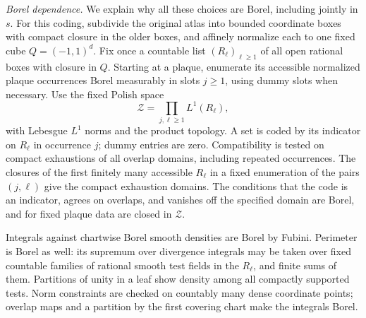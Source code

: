 \emph{Borel dependence.}
We explain why all these choices are Borel, including jointly in $s$.
For this coding, subdivide the original atlas into bounded coordinate
boxes with compact closure in the older boxes, and affinely normalize
each to one fixed cube $Q=(-1,1)^d$.  Fix once a countable list
$(R_\ell)_{\ell\ge1}$ of all open rational boxes with closure in $Q$.
Starting at a plaque, enumerate its accessible normalized plaque
occurrences Borel measurably in slots $j\ge1$, using dummy slots when
necessary.  Use the fixed Polish space
\[
             \mathcal Z=\prod_{j,\ell\ge1}L^1(R_\ell),
\]
with Lebesgue $L^1$ norms and the product topology.  A set is coded by its
indicator on $R_\ell$ in occurrence $j$; dummy entries are zero.
Compatibility is tested on compact exhaustions of all overlap domains,
including repeated occurrences.  The closures of the first finitely
many accessible $R_\ell$ in a fixed enumeration of the pairs $(j,\ell)$
give the compact exhaustion domains.  The conditions that the code is an
indicator, agrees on overlaps, and vanishes off the specified domain are
Borel, and for fixed plaque data are closed in $\mathcal Z$.

Integrals against chartwise Borel smooth densities are Borel by Fubini.
Perimeter is Borel as well: its supremum over divergence integrals may
be taken over fixed countable families of rational smooth test fields in
the $R_\ell$, and finite sums of them.  Partitions of unity in a leaf
show density among all compactly supported tests.  Norm constraints are
checked on countably many dense coordinate points; overlap maps and a
partition by the first covering chart make the integrals Borel.

